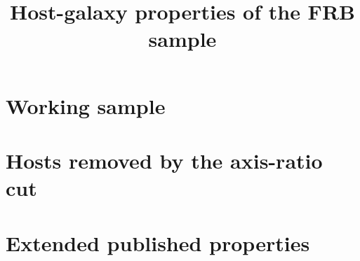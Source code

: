 \documentclass[apjl, linenumbers]{aastex701}
\begin{document}
\title{Host-galaxy properties of the FRB sample}

\author{}
\affiliation{}
\email{}

\section{Working sample}


\section{Hosts removed by the axis-ratio cut}


\section{Extended published properties}




\end{document}
